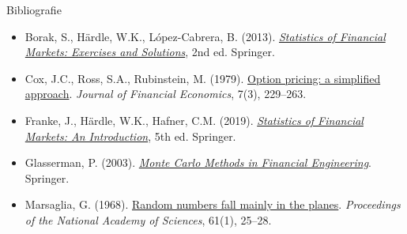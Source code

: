 \begin{frame}{Bibliografie}
\itemsize{\tiny}
\begin{itemize}
    \item Borak, S., Härdle, W.K., López-Cabrera, B. (2013). \href{https://doi.org/10.1007/978-3-642-33929-5}{\textit{Statistics of Financial Markets: Exercises and Solutions}}, 2nd ed. Springer.
    \item Cox, J.C., Ross, S.A., Rubinstein, M. (1979). \href{https://doi.org/10.1016/0304-405X(79)90015-1}{Option pricing: a simplified approach}. \textit{Journal of Financial Economics}, 7(3), 229--263.
    \item Franke, J., Härdle, W.K., Hafner, C.M. (2019). \href{https://doi.org/10.1007/978-3-030-13751-9}{\textit{Statistics of Financial Markets: An Introduction}}, 5th ed. Springer.
    \item Glasserman, P. (2003). \href{https://doi.org/10.1007/978-0-387-21617-1}{\textit{Monte Carlo Methods in Financial Engineering}}. Springer.
    \item Marsaglia, G. (1968). \href{https://doi.org/10.1073/pnas.61.1.25}{Random numbers fall mainly in the planes}. \textit{Proceedings of the National Academy of Sciences}, 61(1), 25--28.
\end{itemize}
\end{frame}


